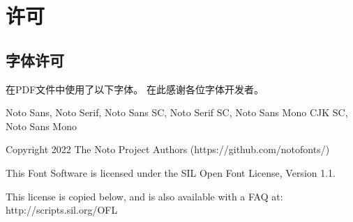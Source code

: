 \chapter*{许可}

\section*{字体许可}

在PDF文件中使用了以下字体。
在此感谢各位字体开发者。

\vspace{\baselineskip}

Noto Sans, Noto Serif, Noto Sans SC, Noto Serif SC, Noto Sans Mono CJK SC, Noto Sans Mono

Copyright 2022 The Noto Project Authors (https://github.com/notofonts/)

This Font Software is licensed under the SIL Open Font License,
Version 1.1.

This license is copied below, and is also available with a FAQ at:
http://scripts.sil.org/OFL


